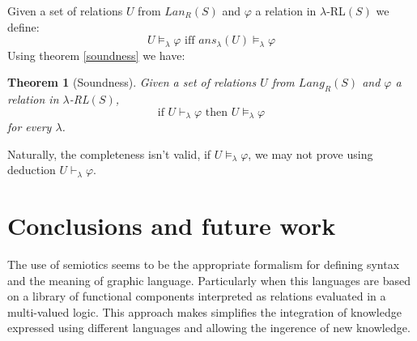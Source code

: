 \documentclass[oribibl]{llncs}
\newtheorem{thm}{Theorem}
\begin{document}
Given a set of relations $U$ from $Lan_R(S)$ and $\varphi$ a
relation in $\lambda$-RL$(S)$ we define:
\[U\models_\lambda \varphi \text{ iff } ans_\lambda(U)\models_\lambda \varphi\]
Using theorem \ref{soundness} we have:
\begin{thm}[Soundness]
Given a set of relations $U$ from $Lang_R(S)$ and $\varphi$ a
relation in $\lambda$-RL$(S)$,
\[\text{if }  U\vdash_\lambda
\varphi\text{ then } U\models_\lambda \varphi \] for every
$\lambda$.
\end{thm}
Naturally, the completeness isn't valid, if $U\models_\lambda
\varphi$, we may not prove using deduction $U\vdash_\lambda
\varphi$.

\section{Conclusions and future work}\label{conclusions}

The use of semiotics seems to be the appropriate formalism for defining syntax and the meaning of graphic language. Particularly when this languages are based on a library of functional components interpreted as relations evaluated in a multi-valued logic. This approach makes simplifies the integration of knowledge expressed using different languages and allowing the ingerence of new knowledge.






\end{document}

